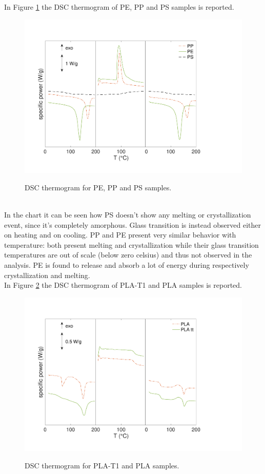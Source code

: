 \documentclass[a4paper, 11pt]{article}
\begin{document}
In Figure \ref{fig:dscPP} the DSC thermogram of PE, PP and PS samples is reported. 
\begin{figure}[htp]
\centering
{\includegraphics[scale=0.3]{dscPP}} 
\captionsetup{justification=centering}
\caption{DSC thermogram for PE, PP and PS samples.}
\label{fig:dscPP}
\end{figure}\\
In the chart it can be seen how PS doesn't show any melting or crystallization event, since it's completely amorphous. Glass transition is instead observed either on heating and on cooling. PP and PE present very similar behavior with temperature: both present melting and crystallization while their glass transition temperatures are out of scale (below zero celsius) and thus not observed in the analysis. PE is found to release and absorb a lot of energy during respectively crystallization and melting.  \\
In Figure \ref{fig:dscPLA} the DSC thermogram of PLA-T1 and PLA samples is reported. 
\begin{figure}[htp]
\centering
{\includegraphics[scale=0.3]{dscPLA}} 
\captionsetup{justification=centering}
\caption{DSC thermogram for PLA-T1 and PLA samples.}
\label{fig:dscPLA}
\end{figure}\\
\end{document}
